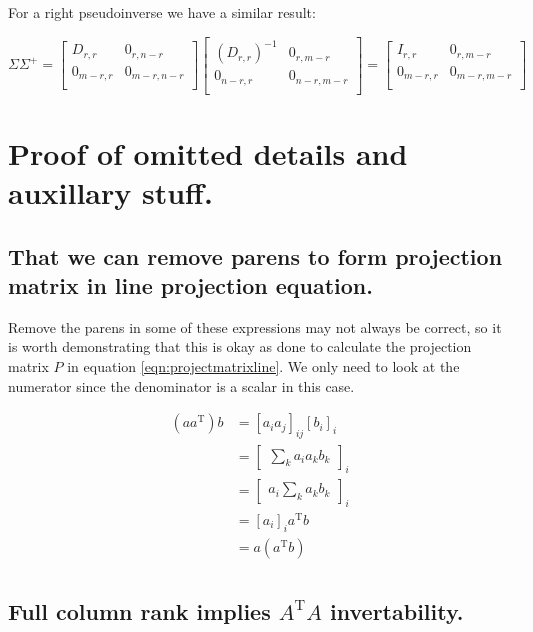 \documentclass{article}      %
\DeclareMathOperator{\TextTranspose}{T}
\newcommand{\transpose}[1]{{{#1}^{\TextTranspose}}}
\begin{document}
For a right pseudoinverse we have a similar result:

\[
\Sigma
\Sigma^{+}
=
\begin{bmatrix}
D_{r,r} & 0_{r,n-r} \\
0_{m-r,r} & 0_{m-r,n-r} \\
\end{bmatrix}
\begin{bmatrix}
(D_{r,r})^{-1} & 0_{r,m-r} \\
0_{n-r,r} & 0_{n-r,m-r} \\
\end{bmatrix}
=
\begin{bmatrix}
I_{r,r} & 0_{r,m-r} \\
0_{m-r,r} & 0_{m-r,m-r} \\
\end{bmatrix}
\]



\section{ Proof of omitted details and auxillary stuff. }

\subsection{ That we can remove parens to form projection matrix in line projection equation. }

Remove the parens in some of these expressions may not always be correct, so it is worth demonstrating that this is okay as
done to calculate the projection matrix $P$ in 
equation \ref{eqn:projectmatrixline}.
We only need to look at the numerator since the denominator is a scalar in this case.

\begin{align*}
(a \transpose{a}) b
&= [ a_i a_j ]_{ij} [b_i]_i \\
&= 
{\begin{bmatrix}
\sum_k a_i a_k b_k
\end{bmatrix}
}_i \\
&= 
{\begin{bmatrix}
a_i \sum_k a_k b_k
\end{bmatrix}
}_i \\
&= [ a_i ]_i \transpose{a} b \\
&= a (\transpose{a} b) \\
\end{align*}

\subsection{ Full column rank implies $\transpose{A}A$ invertability. }
\end{document}

